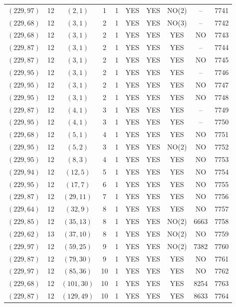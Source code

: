 \begin{longtable}{|c|c|c|c|c|c|c|c|c|c|}
$(229, 97)$ & 12 & $(2, 1)$ & 1 & 1 & YES & YES & NO(2) & -- & 7741\\
$(229, 68)$ & 12 & $(3, 1)$ & 2 & 1 & YES & YES & NO(3) & -- & 7742\\
$(229, 68)$ & 12 & $(3, 1)$ & 2 & 1 & YES & YES & YES & NO & 7743\\
$(229, 87)$ & 12 & $(3, 1)$ & 2 & 1 & YES & YES & YES & -- & 7744\\
$(229, 87)$ & 12 & $(3, 1)$ & 2 & 1 & YES & YES & YES & NO & 7745\\
$(229, 95)$ & 12 & $(3, 1)$ & 2 & 1 & YES & YES & YES & -- & 7746\\
$(229, 95)$ & 12 & $(3, 1)$ & 2 & 1 & YES & YES & YES & NO & 7747\\
$(229, 95)$ & 12 & $(3, 1)$ & 2 & 1 & YES & YES & YES & NO & 7748\\
$(229, 87)$ & 12 & $(4, 1)$ & 3 & 1 & YES & YES & YES & -- & 7749\\
$(229, 95)$ & 12 & $(4, 1)$ & 3 & 1 & YES & YES & YES & -- & 7750\\
$(229, 68)$ & 12 & $(5, 1)$ & 4 & 1 & YES & YES & YES & NO & 7751\\
$(229, 95)$ & 12 & $(5, 2)$ & 3 & 1 & YES & YES & NO(2) & NO & 7752\\
$(229, 95)$ & 12 & $(8, 3)$ & 4 & 1 & YES & YES & YES & NO & 7753\\
$(229, 94)$ & 12 & $(12, 5)$ & 5 & 1 & YES & YES & YES & NO & 7754\\
$(229, 95)$ & 12 & $(17, 7)$ & 6 & 1 & YES & YES & YES & NO & 7755\\
$(229, 87)$ & 12 & $(29, 11)$ & 7 & 1 & YES & YES & YES & NO & 7756\\
$(229, 64)$ & 12 & $(32, 9)$ & 8 & 1 & YES & YES & YES & NO & 7757\\
$(229, 85)$ & 12 & $(35, 13)$ & 8 & 1 & YES & YES & NO(2) & 6663 & 7758\\
$(229, 62)$ & 13 & $(37, 10)$ & 8 & 1 & YES & YES & NO(2) & NO & 7759\\
$(229, 97)$ & 12 & $(59, 25)$ & 9 & 1 & YES & YES & NO(2) & 7382 & 7760\\
$(229, 87)$ & 12 & $(79, 30)$ & 9 & 1 & YES & YES & YES & NO & 7761\\
$(229, 97)$ & 12 & $(85, 36)$ & 10 & 1 & YES & YES & YES & NO & 7762\\
$(229, 68)$ & 12 & $(101, 30)$ & 10 & 1 & YES & YES & YES & 8254 & 7763\\
$(229, 87)$ & 12 & $(129, 49)$ & 10 & 1 & YES & YES & YES & 8633 & 7764\\

\end{longtable}
